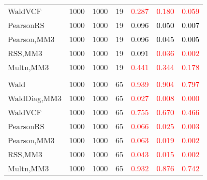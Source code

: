 \documentclass[
]{article}
\begin{document}
\begin{table}[H]
{\begin{tabular}[t]{lrrrrrr}
\hspace{1em}WaldVCF & 1000 & 1000 & 19 & \textcolor{red}{0.287} & \textcolor{red}{0.180} & \textcolor{red}{0.059}\\
\hspace{1em}PearsonRS & 1000 & 1000 & 19 & \textcolor{black}{0.096} & \textcolor{black}{0.050} & \textcolor{black}{0.007}\\
\hspace{1em}Pearson,MM3 & 1000 & 1000 & 19 & \textcolor{black}{0.096} & \textcolor{black}{0.045} & \textcolor{black}{0.005}\\
\hspace{1em}RSS,MM3 & 1000 & 1000 & 19 & \textcolor{black}{0.091} & \textcolor{red}{0.036} & \textcolor{red}{0.002}\\
\hspace{1em}Multn,MM3 & 1000 & 1000 & 19 & \textcolor{red}{0.441} & \textcolor{red}{0.344} & \textcolor{red}{0.178}\\
\addlinespace[0.3em]
\multicolumn{7}{l}{\textbf{3F 15V}}\\
\hspace{1em}Wald & 1000 & 1000 & 65 & \textcolor{red}{0.939} & \textcolor{red}{0.904} & \textcolor{red}{0.797}\\
\hspace{1em}WaldDiag,MM3 & 1000 & 1000 & 65 & \textcolor{red}{0.027} & \textcolor{red}{0.008} & \textcolor{red}{0.000}\\
\hspace{1em}WaldVCF & 1000 & 1000 & 65 & \textcolor{red}{0.755} & \textcolor{red}{0.670} & \textcolor{red}{0.466}\\
\hspace{1em}PearsonRS & 1000 & 1000 & 65 & \textcolor{red}{0.066} & \textcolor{red}{0.025} & \textcolor{red}{0.003}\\
\hspace{1em}Pearson,MM3 & 1000 & 1000 & 65 & \textcolor{red}{0.063} & \textcolor{red}{0.019} & \textcolor{red}{0.002}\\
\hspace{1em}RSS,MM3 & 1000 & 1000 & 65 & \textcolor{red}{0.043} & \textcolor{red}{0.015} & \textcolor{red}{0.002}\\
\hspace{1em}Multn,MM3 & 1000 & 1000 & 65 & \textcolor{red}{0.932} & \textcolor{red}{0.876} & \textcolor{red}{0.742}\\
\bottomrule
\end{tabular}}
\endgroup{}
\end{table}
\end{document}
